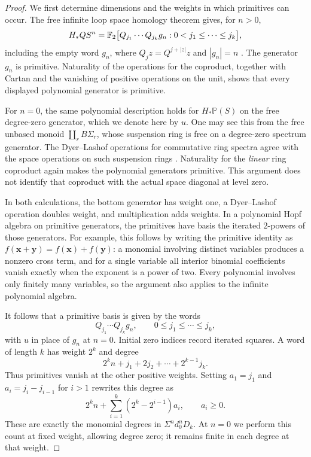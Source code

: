 \begin{proof}
We first determine dimensions and the weights in which primitives can
occur. The free infinite loop space homology theorem gives, for $n>0$,
\begin{equation}\label{eq:free-homology-basis}
 H_*QS^n=
 \mathbb F_2\bigl[Q_{j_1}\cdots Q_{j_k}g_n:
          0<j_1\leq\cdots\leq j_k\bigr],
\end{equation}
including the empty word $g_n$, where
$Q_jz=Q^{j+|z|}z$ and $|g_n|=n$ \cite{CLM1976}.
The generator $g_n$ is primitive. Naturality of the operations for the
coproduct, together with Cartan and the vanishing of positive
operations on the unit, shows that every displayed polynomial
generator is primitive.

For $n=0$, the same polynomial description holds for
$H_*\mathbb P(S)$ on the free degree-zero generator, which we denote
here by $u$. One may see this from the free unbased monoid
$\coprod_rB\Sigma_r$, whose suspension ring is free on a degree-zero
spectrum generator. The Dyer--Lashof operations for commutative ring
spectra agree with the space operations on such suspension rings
\cite{BMMS1986}. Naturality for the \emph{linear} ring coproduct again
makes the polynomial generators primitive. This argument does not
identify that coproduct with the actual space diagonal at level zero.

In both calculations, the bottom generator has weight one, a
Dyer--Lashof operation doubles weight, and multiplication adds weights.
In a polynomial Hopf algebra on primitive generators, the primitives
have basis the iterated $2$-powers of those generators. For example,
this follows by writing the primitive identity as
$f(\mathbf x+\mathbf y)=f(\mathbf x)+f(\mathbf y)$: a monomial involving
distinct variables produces a nonzero cross term, and for a single
variable all interior binomial coefficients vanish exactly when the
exponent is a power of two. Every polynomial involves only finitely
many variables, so the argument also applies to the infinite
polynomial algebra.

It follows that a primitive basis is given by the words
\[
 Q_{j_1}\cdots Q_{j_k}g_n,
 \qquad 0\leq j_1\leq\cdots\leq j_k,
\]
with $u$ in place of $g_n$ at $n=0$. Initial zero indices record
iterated squares. A word of length $k$ has weight $2^k$ and degree
\[
 2^kn+j_1+2j_2+\cdots+2^{k-1}j_k.
\]
Thus primitives vanish at the other positive weights. Setting
$a_1=j_1$ and $a_i=j_i-j_{i-1}$ for $i>1$ rewrites this degree as
\begin{equation}\label{eq:primitive-degree-count}
 2^kn+\sum_{i=1}^k(2^k-2^{i-1})a_i,
 \qquad a_i\geq0.
\end{equation}
These are exactly the monomial degrees in
$\Sigma^nd_0^nD_k$. At $n=0$ we perform this count at fixed weight,
allowing degree zero; it remains finite in each degree at that weight.


\end{proof}
